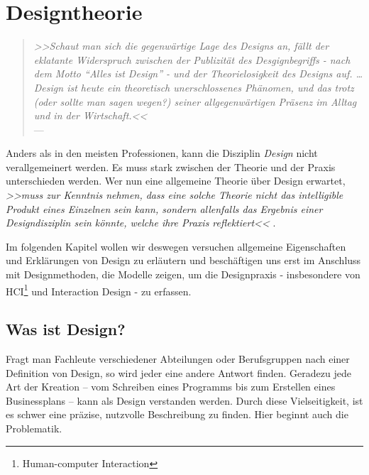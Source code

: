 \chapter{Designtheorie}\label{ch:designTheorie}

\begin{quote}
	\begin{flushright}{\slshape    
	    >>Schaut man sich die gegenwärtige Lage des Designs an, fällt der eklatante Widerspruch zwischen der Publizität des Desgignbegriffs - nach dem Motto ``Alles ist Design'' - und der Theorielosigkeit des Designs auf. \ldots Design ist heute ein theoretisch unerschlossenes Phänomen, und das trotz (oder sollte man sagen wegen?) seiner allgegenwärtigen Präsenz im Alltag und in der Wirtschaft.<<} \\ \medskip
	    ---  \citep{Bonsiepe:1992}
	\end{flushright}
\end{quote}

Anders als in den meisten Professionen, kann die Disziplin \emph{Design} nicht verallgemeinert werden. Es muss stark zwischen der Theorie und der Praxis unterschieden werden. Wer nun eine allgemeine Theorie über Design erwartet, \emph{>>muss zur Kenntnis nehmen, dass eine solche Theorie nicht das intelligible Produkt eines Einzelnen sein kann, sondern allenfalls das Ergebnis einer Designdisziplin sein könnte, welche ihre Praxis reflektiert<<} \citep{Schneider:2008}.

\medskip Im folgenden Kapitel wollen wir deswegen versuchen allgemeine Eigenschaften und Erklärungen von Design zu erläutern und beschäftigen uns erst im Anschluss mit Designmethoden, die Modelle zeigen, um die Designpraxis - insbesondere von HCI\footnote{Human-computer Interaction} und Interaction Design - zu erfassen.

\section{Was ist Design?}
Fragt man Fachleute verschiedener Abteilungen oder Berufsgruppen nach einer Definition von Design, so wird jeder eine andere Antwort finden. Geradezu jede Art der Kreation – vom Schreiben eines Programms bis zum Erstellen eines Businessplans – kann als Design verstanden werden. Durch diese Vielseitigkeit, ist es schwer eine präzise, nutzvolle Beschreibung zu finden.  Hier beginnt auch die Problematik. \citep{Sagmeister:2008}

